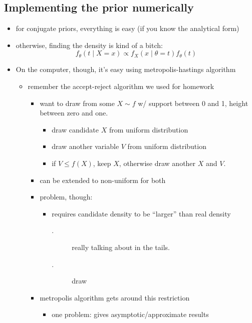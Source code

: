 \subsection{Implementing the prior numerically}

\begin{itemize}[leftmargin=0pt]
\item for conjugate priors, everything is easy (if you know the analytical form)
\item otherwise, finding the density is kind of a bitch:
  \[f_\theta(t \mid X = x) \propto f_X(x \mid \theta = t) f_\theta(t)\]
\item On the computer, though, it's easy using metropolis-hastings algorithm
\begin{itemize}
\item remember the accept-reject algorithm we used for homework
\begin{itemize}
\item want to draw from some $X \sim f$ w/ support between 0 and 1,
         height between zero and one.
\begin{itemize}
\item draw candidate $X$ from uniform distribution
\item draw another variable $V$ from uniform distribution
\item if $V \leq f(X)$, keep $X$, otherwise draw another $X$ and $V$.
\end{itemize}
\item can be extended to non-uniform for both
\item problem, though:
\begin{itemize}
\item requires candidate density to be ``larger'' than real density
\begin{description}
\item[.] really talking about in the tails.
\item[.] draw
\end{description}
\end{itemize}
\item metropolis algorithm gets around this restriction
\begin{itemize}
\item one problem: gives asymptotic/approximate results
\end{itemize}
\end{itemize}
\end{itemize}
\end{itemize}

